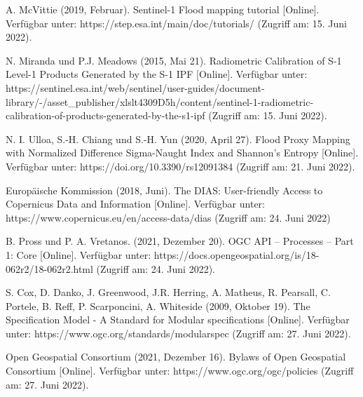 \begin{thebibliography}{1}
A. McVittie (2019, Februar). Sentinel-1 Flood mapping tutorial [Online]. Verfügbar unter: 
https://step.esa.int/main/doc/tutorials/
(Zugriff am: 15. Juni 2022).

N. Miranda und P.J. Meadows (2015, Mai 21). Radiometric Calibration of S-1 Level-1 Products Generated by the S-1 IPF [Online]. Verfügbar unter: 
https://sentinel.esa.int/web/sentinel/user-guides/document-library/-/asset\_publisher/xlslt4309D5h/content/sentinel-1-radiometric-calibration-of-products-generated-by-the-s1-ipf
(Zugriff am: 15. Juni 2022).

N. I. Ulloa, S.-H. Chiang und S.-H. Yun (2020, April 27). Flood Proxy Mapping with Normalized Difference Sigma-Naught Index and Shannon’s Entropy [Online]. Verfügbar unter: 
https://doi.org/10.3390/rs12091384 
(Zugriff am: 21. Juni 2022).

Europäische Kommission (2018, Juni). The DIAS: User-friendly Access to Copernicus Data and Information [Online]. Verfügbar unter:
https://www.copernicus.eu/en/access-data/dias
(Zugriff am: 24. Juni 2022)

B. Pross und P. A. Vretanos. (2021, Dezember 20). OGC API – Processes – Part 1: Core [Online]. Verfügbar unter: 
https://docs.opengeospatial.org/is/18-062r2/18-062r2.html 
(Zugriff am: 24. Juni 2022).

S. Cox, D. Danko, J. Greenwood, J.R. Herring, A. Matheus, R. Pearsall, C. Portele, B. Reff, P. Scarponcini, A. Whiteside (2009, Oktober 19). The Specification Model - A Standard for Modular specifications [Online]. Verfügbar unter: 
https://www.ogc.org/standards/modularspec 
(Zugriff am: 27. Juni 2022).

Open Geospatial Consortium (2021, Dezember 16). Bylaws of Open Geospatial Consortium [Online]. Verfügbar unter: 
https://www.ogc.org/ogc/policies
(Zugriff am: 27. Juni 2022).

\end{thebibliography}